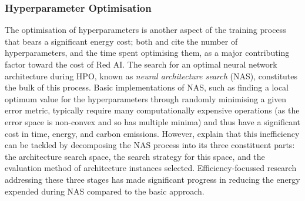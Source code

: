 \documentclass[a4paper, 12pt]{article}
\begin{document}
    \subsubsection{Hyperparameter Optimisation}

    The optimisation of hyperparameters is another aspect of the training process that bears a significant energy cost; both  and  cite the number of hyperparameters, and the time spent optimising them, as a major contributing factor toward the cost of Red AI. The search for an optimal neural network architecture during HPO, known as \emph{neural architecture search} (NAS), constitutes the bulk of this process. Basic implementations of NAS, such as finding a local optimum value for the hyperparameters through randomly minimising a given error metric, typically require many computationally expensive operations (as the error space is non-convex and so has multiple minima) and thus have a significant cost in time, energy, and carbon emissions. However,  explain that this inefficiency can be tackled by decomposing the NAS process into its three constituent parts: the architecture search space, the search strategy for this space, and the evaluation method of architecture instances selected. Efficiency-focussed research addressing these three stages has made significant progress in reducing the energy expended during NAS compared to the basic approach. 
\end{document}

